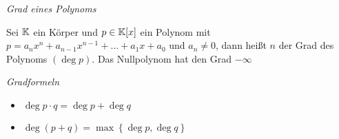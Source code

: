 
\begin{mydef}\textit{Grad eines Polynoms}\medskip

    Sei $\mathbb{K}$ ein Körper und $p \in \mathbb{K}[x]$ ein Polynom mit $p = a_n x^n + a_{n-1} x^{n-1} + \ldots + a_1 x + a_0$ und $a_n \neq 0$, dann heißt $n$ der Grad des Polynoms $(\deg p)$. Das Nullpolynom hat den Grad $-\infty$
\end{mydef}

\begin{mylemma}\label{gradformeln}\textit{Gradformeln}
    \begin{itemize}
        \item $\deg p \cdot q = \deg p + \deg q$
        \item $\deg(p + q) = \max \left\{ \deg p, \deg q \right\}$
    \end{itemize}
\end{mylemma}


